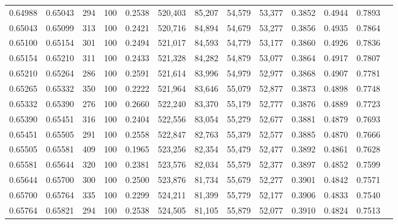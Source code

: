 \begin{tabular}{rrrrrrrrrrrrr}
0.64988 & 0.65043 &   294 & 100 &                                     0.2538 & 520,403 &  85,207 &  54,579 &  53,377 & 0.3852 & 0.4944 & 0.7893 \\
0.65043 & 0.65099 &   313 & 100 &                                     0.2421 & 520,716 &  84,894 &  54,679 &  53,277 & 0.3856 & 0.4935 & 0.7864 \\
0.65100 & 0.65154 &   301 & 100 &                                     0.2494 & 521,017 &  84,593 &  54,779 &  53,177 & 0.3860 & 0.4926 & 0.7836 \\
0.65154 & 0.65210 &   311 & 100 &                                     0.2433 & 521,328 &  84,282 &  54,879 &  53,077 & 0.3864 & 0.4917 & 0.7807 \\
0.65210 & 0.65264 &   286 & 100 &                                     0.2591 & 521,614 &  83,996 &  54,979 &  52,977 & 0.3868 & 0.4907 & 0.7781 \\
0.65265 & 0.65332 &   350 & 100 &                                     0.2222 & 521,964 &  83,646 &  55,079 &  52,877 & 0.3873 & 0.4898 & 0.7748 \\
0.65332 & 0.65390 &   276 & 100 &                                     0.2660 & 522,240 &  83,370 &  55,179 &  52,777 & 0.3876 & 0.4889 & 0.7723 \\
0.65390 & 0.65451 &   316 & 100 &                                     0.2404 & 522,556 &  83,054 &  55,279 &  52,677 & 0.3881 & 0.4879 & 0.7693 \\
0.65451 & 0.65505 &   291 & 100 &                                     0.2558 & 522,847 &  82,763 &  55,379 &  52,577 & 0.3885 & 0.4870 & 0.7666 \\
0.65505 & 0.65581 &   409 & 100 &                                     0.1965 & 523,256 &  82,354 &  55,479 &  52,477 & 0.3892 & 0.4861 & 0.7628 \\
0.65581 & 0.65644 &   320 & 100 &                                     0.2381 & 523,576 &  82,034 &  55,579 &  52,377 & 0.3897 & 0.4852 & 0.7599 \\
0.65644 & 0.65700 &   300 & 100 &                                     0.2500 & 523,876 &  81,734 &  55,679 &  52,277 & 0.3901 & 0.4842 & 0.7571 \\
0.65700 & 0.65764 &   335 & 100 &                                     0.2299 & 524,211 &  81,399 &  55,779 &  52,177 & 0.3906 & 0.4833 & 0.7540 \\
0.65764 & 0.65821 &   294 & 100 &                                     0.2538 & 524,505 &  81,105 &  55,879 &  52,077 & 0.3910 & 0.4824 & 0.7513 \\

\end{tabular}
